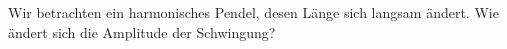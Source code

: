 \begin{Exercise}[label = adi, title = Pendel, difficulty = 5, origin = 1911]
	Wir betrachten ein harmonisches Pendel, desen Länge sich langsam ändert. Wie ändert sich die Amplitude der Schwingung?
\end{Exercise}